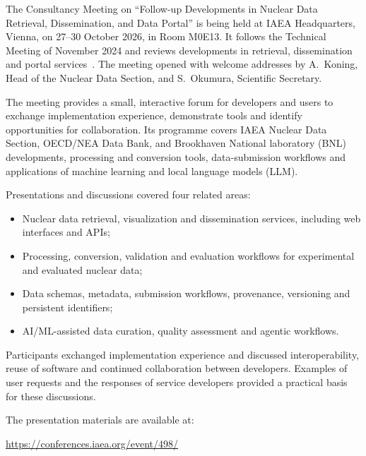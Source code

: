The Consultancy Meeting on ``Follow-up Developments in Nuclear Data Retrieval, Dissemination, and Data Portal'' is being held at IAEA Headquarters, Vienna, on 27--30 October 2026, in Room M0E13. It follows the Technical Meeting of November 2024 and reviews developments in retrieval, dissemination and portal services~\cite{meeting498,report2024}. The meeting opened with welcome addresses by A.~Koning, Head of the Nuclear Data Section, and S.~Okumura, Scientific Secretary.

The meeting provides a small, interactive forum for developers and users to exchange implementation experience, demonstrate tools and identify opportunities for collaboration. Its programme covers IAEA Nuclear Data Section, OECD/NEA Data Bank, and Brookhaven National laboratory (BNL) developments, processing and conversion tools, data-submission workflows and applications of machine learning and local language models (LLM).

Presentations and discussions covered four related areas:
\begin{itemize}
    \item Nuclear data retrieval, visualization and dissemination services, including web interfaces and APIs;
    \item Processing, conversion, validation and evaluation workflows for experimental and evaluated nuclear data;
    \item Data schemas, metadata, submission workflows, provenance, versioning and persistent identifiers;
    \item AI/ML-assisted data curation, quality assessment and agentic workflows.
\end{itemize}
Participants exchanged implementation experience and discussed interoperability, reuse of software and continued collaboration between developers. Examples of user requests and the responses of service developers provided a practical basis for these discussions.
 

The presentation materials are available at:
\begin{center}
    \url{https://conferences.iaea.org/event/498/}
\end{center}

